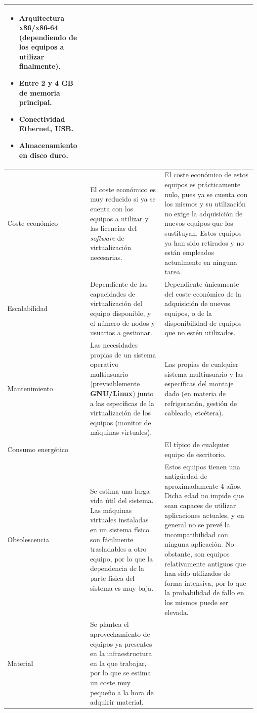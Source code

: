 \begin{table}
\begin{tabular}{|p{2.3cm}|p{6.5cm}|p{6.5cm}|}
\begin{itemize}[noitemsep]
  \item Arquitectura x86/x86-64 (dependiendo de los equipos a utilizar finalmente).
  \item Entre 2 y 4 GB de memoria principal.
  \item Conectividad Ethernet, USB.
  \item Almacenamiento en disco duro.
\end{itemize}\\
\hline
Coste económico&El coste económico es muy reducido si ya se cuenta con los equipos a utilizar y las licencias del \textit{software} de virtualización necesarias.&El coste económico de estos equipos es prácticamente nulo, pues ya se cuenta con los mismos y su utilización no exige la adquisición de nuevos equipos que los sustituyan. Estos equipos ya han sido retirados y no están empleados actualmente en ninguna tarea.\\
\hline
Escalabilidad&Dependiente de las capacidades de virtualización del equipo disponible, y el número de nodos y usuarios a gestionar.&Dependiente únicamente del coste económico de la adquisición de nuevos equipos, o de la disponibilidad de equipos que no estén utilizados.\\
\hline
Mantenimiento&Las necesidades propias de un sistema operativo multiusuario (previsiblemente \textbf{GNU/Linux}) junto a las específicas de la virtualización de los equipos (monitor de máquinas virtuales).&Las propias de cualquier sistema multiusuario y las específicas del montaje dado (en materia de refrigeración, gestión de cableado, etcétera).
\\
\hline
Consumo energético&&El típico de cualquier equipo de escritorio.\\
\hline
Obsolescencia&Se estima una larga vida útil del sistema. Las máquinas virtuales instaladas en un sistema físico son fácilmente trasladables a otro equipo, por lo que la dependencia de la parte física del sistema es muy baja.&Estos equipos tienen una antigüedad de aproximadamente 4 años. Dicha edad no impide que sean capaces de utilizar aplicaciones actuales, y en general no se prevé la incompatibilidad con ninguna aplicación. No obstante, son equipos relativamente antiguos que han sido utilizados de forma intensiva, por lo que la probabilidad de fallo en los mismos puede ser elevada.\\
\hline
Material&Se plantea el aprovechamiento de equipos ya presentes en la infraestructura en la que trabajar, por lo que se estima un coste muy pequeño a la hora de adquirir material.&

\end{tabular}
\end{table}
